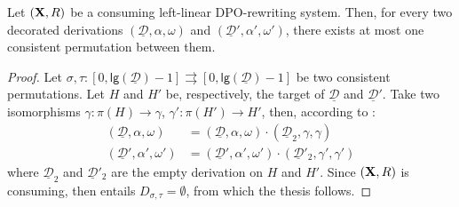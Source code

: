 \documentclass[a4paper,UKenglish,cleveref,pdftex, thm-restate,numberwithinsect]{lipics}
\def\R{\mathsf{R}}
\def\X{\textbf {\textup{X}}}
\newcommand{\dder}[1]{\mathscr{#1}}
\newcommand{\der}[1]{\underline{\dder{#1}}}
\newcommand{\lgh}[0]{\mathsf{lg}}
\begin{document}
\begin{corollary}\label{cor:unique}
Let $(\X,\R)$ be a consuming left-linear DPO-rewriting system. Then, for every two decorated derivations $(\der{D}, \alpha, \omega)$ and $(\der{D}', \alpha', \omega')$, there exists at most one consistent permutation between them.
\end{corollary}
\begin{proof}
Let $\sigma, \tau: [0, \lgh(\der{D})-1]\rightrightarrows [0, \lgh(\der{D})-1]$ be two consistent permutations. Let $H$  and $H'$ be, respectively, the target of $\der{D}$ and $\der{D}'$. Take two isomorphisms $\gamma:\pi(H)\to \gamma$, $\gamma':\pi(H')\to H'$, then, according to :
\begin{align*}(\der{D}, \alpha, \omega)&=(\der{D}, \alpha, \omega)\cdot (\der{D}_2, \gamma, \gamma) \\(\der{D}', \alpha', \omega')&=(\der{D}', \alpha', \omega')\cdot (\der{D}'_2, \gamma', \gamma') 
\end{align*} 
where $\der{D}_2$ and $\der{D}'_2$ are the empty derivation on $H$ and $H'$. Since $(\X, \R)$ is consuming, then  entails $D_{\sigma, \tau}=\emptyset$, from which the thesis follows.
\end{proof}
\end{document}

